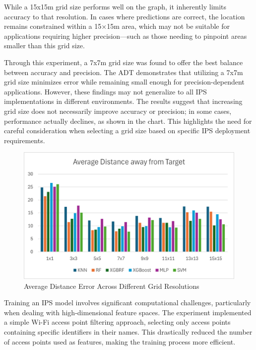 \documentclass[runningheads]{llncs}
\begin{document}
While a 15x15m grid size performs well on the graph, it inherently limits accuracy to that resolution. In cases where predictions are correct, the location remains constrained within a 15×15m area, which may not be suitable for applications requiring higher precision—such as those needing to pinpoint areas smaller than this grid size.

Through this experiment, a 7x7m grid size was found to offer the best balance between accuracy and precision. The ADT demonstrates that utilizing a 7x7m grid size minimizes error while remaining small enough for precision-dependent applications. However, these findings may not generalize to all IPS implementations in different environments. The results suggest that increasing grid size does not necessarily improve accuracy or precision; in some cases, performance actually declines, as shown in the chart. This highlights the need for careful consideration when selecting a grid size based on specific IPS deployment requirements.



\vspace{-10pt}

\begin{figure}[htbp]
	\centerline{\includegraphics[scale=0.65]{image2.png}}
	\caption{Average Distance Error Across Different Grid Resolutions}
	\label{fig:Avg_dis_err}
\end{figure}



Training an IPS model involves significant computational challenges, particularly when dealing with high-dimensional feature spaces. The experiment implemented a simple Wi-Fi access point filtering approach, selecting only access points containing specific identifiers in their names. This drastically reduced the number of access points used as features, making the training process more efficient.
\end{document}
